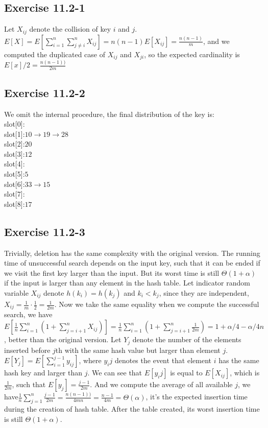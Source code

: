 \documentclass[12pt]{article}
\theoremstyle{definition}
\theoremstyle{remark}
\begin{document}
\subsection*{Exercise 11.2-1}
Let $X_{ij}$ denote the collision of key $i$ and $j$. $E[X]=E[\sum_{i=1}^n\sum_{j\not=i}^nX_{ij}]=n(n-1)E[X_{ij}]=\frac{n(n-1)}{m}$, and we computed the duplicated case of $X_{ij}$ and $X_{ji}$, so the expected cardinality is $E[x]/2=\frac{n(n-1))}{2m}$
\subsection*{Exercise 11.2-2}
We omit the internal procedure, the final distribution of the key is:\\
slot[0]:\\
slot[1]:$10\rightarrow19\rightarrow28$\\
slot[2]:$20$\\
slot[3]:$12$\\
slot[4]:\\
slot[5]:$5$\\
slot[6]:$33\rightarrow15$\\
slot[7]:\\
slot[8]:$17$\\
\subsection*{Exercise 11.2-3}
Trivially, deletion has the same complexity with the original version. The running time of unsuccessful search depends on the input key, such that it can be ended if we visit the first key larger than the input. But its worst time is still $\Theta(1+\alpha)$ if the input is larger than any element in the hash table. Let indicator random variable $X_{ij}$ denote $h(k_i)=h(k_j)$ and $k_i<k_j$, since they are independent, $X_{ij}=\frac{1}{m}\cdot\frac{1}{2}=\frac{1}{2m}$. Now we take the same equality when we compute the successful search, we have$E[\frac{1}{n}\sum_{i=1}^n(1+\sum_{j=i+1}^nX_{ij})]=\frac{1}{n}\sum_{i=1}^n(1+\sum_{j=i+1}^n\frac{1}{2m})=1+\alpha/4-\alpha/4n$, better than the original version. Let $Y_j$ denote the number of the elements inserted before $j$th with the same hash value but larger than element $j$. $E[Y_j]=E[\sum_{i=1}^{j-1}y_{ij}]$, where $y_ij$ denotes the event that element $i$ has the same hash key and larger than $j$. We can see that $E[y_ij]$ is equal to $E[X_{ij}]$, which is $\frac{1}{2m}$, such that $E[y_j]=\frac{j-1}{2m}$. And we compute the average of all available $j$, we have$\frac{1}{n}\sum_{j=1}^{n}\frac{j-1}{2m}=\frac{n(n-1))}{4mn}=\frac{n-1}{4m}=\Theta(\alpha)$, it's the expected insertion time during the creation of hash table. After the table created, its worst insertion time is still $\Theta(1+\alpha)$.
\end{document}
